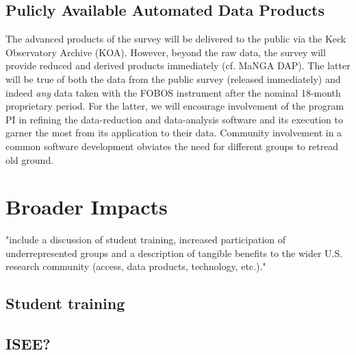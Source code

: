 \documentclass[oneside,11pt]{amsart}
\newcommand{\comment}[2][todo]{{\color{#1}[[{\bf #2}]]}}
\begin{document}
\subsection{Pulicly Available Automated Data Products}
\label{sec:DAP}
\noindent \comment{1/2 page}

The advanced products of the survey will be delivered to the public via
the Keck Observatory Archive (KOA).  However, beyond the raw data, the
survey will provide reduced and derived products immediately (cf. MaNGA
DAP).  The latter will be true of both the data from the public survey
(released immediately) and indeed {\it any} data taken with the FOBOS
instrument after the nominal 18-month proprietary period.  For the
latter, we will encourage involvement of the program PI in refining the
data-reduction and data-analysis software and its execution to garner
the most from its application to their data.  Community involvement in a
common software development obviates the need for different groups to
retread old ground.



\section{Broader Impacts}
\label{sec:bi}

"include a discussion of student training, increased participation of
underrepresented groups and a description of tangible benefits to the
wider U.S. research community (access, data products, technology,
etc.)."

\subsection{Student training}
\label{sec:training}
\noindent \comment{1/4 page}

\subsection{ISEE?}
\noindent \comment{1/2 page}


% 
% 
% 
% 
% 
% 
% 
% 
% 
% 
% 
% 
\end{document}
